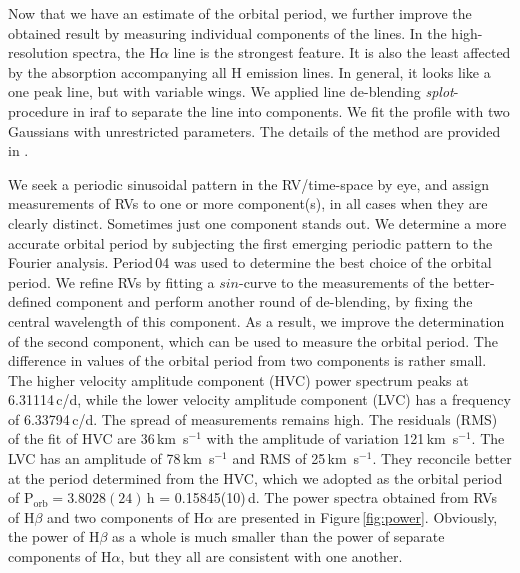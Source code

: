 \documentclass[fleqn,usenatbib]{mnras}
\begin{document}
Now that we have an estimate of the orbital period, we  
further improve the obtained result by measuring individual components of the lines. 
In the high-resolution spectra, the H$\alpha$ line is the strongest feature. It is also the least affected by the absorption accompanying all H
emission lines. In general, it looks like a one peak line, but with variable wings. We applied line de-blending {\sl splot}-procedure in 
{\sc iraf} to separate the line into  components. 
We fit the profile with two Gaussians with unrestricted parameters.
The details of the  method are provided in \citet{2018ApJ...869...22T}.

We seek a periodic sinusoidal pattern in the RV/time-space by eye, and assign measurements of RVs to one or more
component(s), in all cases when they are clearly distinct. %
Sometimes just one component stands out.  
We determine a more accurate orbital period by subjecting the first emerging periodic pattern to the Fourier analysis. Period\,04 was
used to determine the best choice of the orbital period. We refine RVs by fitting a $sin$-curve to the measurements of the better-defined
component and perform another round of de-blending, by fixing the central wavelength of this component. As a result, we improve the
determination of the second component, which can be used to measure the orbital period. The difference in values of the orbital period
from two components is rather small.   The higher velocity amplitude component (HVC) power spectrum peaks at 6.31114\,c/d, while the lower
velocity amplitude  component (LVC) has a frequency of 6.33794\,c/d. The spread of measurements remains high. The residuals (RMS) of the fit of
HVC are 36\,km~s$^{-1}$ with the amplitude of variation 121\,km~s$^{-1}$. The LVC has an amplitude of 78\,km~s$^{-1}$ and
RMS of 25\,km~s$^{-1}$.  They reconcile better at the period determined from the HVC, which we adopted as the orbital period of 
P$_{\mathrm {orb}}=3.8028(24)$\,h = 0.15845(10)\,d.
The power spectra obtained from RVs of H$\beta$ and two components of H$\alpha$ are presented in Figure\,\ref{fig:power}. Obviously, the power
of H$\beta$ as a whole is much smaller than the power of separate components of H$\alpha$, but they all are consistent with one another.
\end{document}
